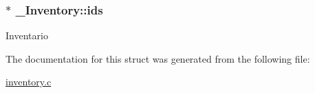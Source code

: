 \subsubsection[{\texorpdfstring{ids}{ids}}]{$\ast$ \+\_\+\+Inventory\+::ids}\hypertarget{struct__Inventory_a7f6b5d7d1111e7e8f8999c656ae27d0c}{}\label{struct__Inventory_a7f6b5d7d1111e7e8f8999c656ae27d0c}
Inventario 

The documentation for this struct was generated from the following file\+:\begin{DoxyCompactItemize}
\item 
\hyperlink{inventory_8c}{inventory.\+c}\end{DoxyCompactItemize}
